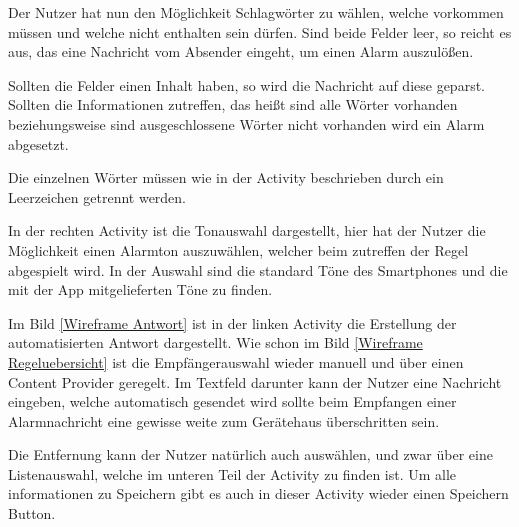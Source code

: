 Der Nutzer hat nun den M\"oglichkeit Schlagw\"orter zu w\"ahlen, welche vorkommen m\"ussen und welche nicht enthalten sein d\"urfen. Sind beide Felder leer, so reicht es aus, das eine Nachricht vom Absender eingeht, um einen Alarm auszul\"o\ss{}en.

Sollten die Felder einen Inhalt haben, so wird die Nachricht auf diese geparst. Sollten die Informationen zutreffen, das hei\ss{}t sind alle W\"orter vorhanden beziehungsweise sind ausgeschlossene W\"orter nicht vorhanden wird ein Alarm abgesetzt. 

Die einzelnen W\"orter m\"ussen wie in der Activity beschrieben durch ein Leerzeichen getrennt werden.

In der rechten Activity ist die Tonauswahl dargestellt, hier hat der Nutzer die M\"oglichkeit einen Alarmton auszuw\"ahlen, welcher beim zutreffen der Regel abgespielt wird. In der Auswahl sind die standard T\"one des Smartphones und die mit der App mitgelieferten T\"one zu finden.

Im Bild \ref{Wireframe Antwort} ist in der linken Activity die Erstellung der automatisierten Antwort dargestellt. Wie schon im Bild \ref{Wireframe Regeluebersicht} ist die Empf\"angerauswahl wieder manuell und \"uber einen Content Provider geregelt. Im Textfeld darunter kann der Nutzer eine Nachricht eingeben, welche automatisch gesendet wird sollte beim Empfangen einer Alarmnachricht eine gewisse weite zum Ger\"atehaus \"uberschritten sein.

Die Entfernung kann der Nutzer nat\"urlich auch ausw\"ahlen, und zwar \"uber eine Listenauswahl, welche im unteren Teil der Activity zu finden ist. Um alle informationen zu Speichern gibt es auch in dieser Activity wieder einen Speichern Button.

